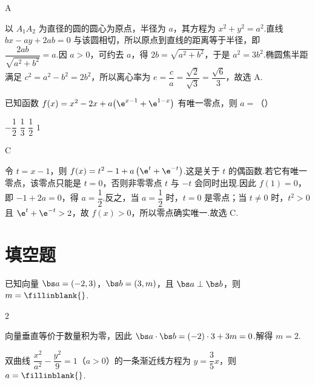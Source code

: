 \begin{answer}
A
\end{answer}

\begin{solution}
以 \(A_1A_2\) 为直径的圆的圆心为原点，半径为 \(a\)，其方程为 \(x^2+y^2=a^2\).直线 \(bx-ay+2ab=0\) 与该圆相切，所以原点到直线的距离等于半径，即
\(\dfrac{2ab}{\sqrt{a^2+b^2}}=a\).因 \(a>0\)，可约去 \(a\)，得 \(2b=\sqrt{a^2+b^2}\)，于是 \(a^2=3b^2\).椭圆焦半距满足 \(c^2=a^2-b^2=2b^2\)，所以离心率为 \(e=\dfrac ca=\dfrac{\sqrt2}{\sqrt3}=\dfrac{\sqrt6}{3}\)，故选 A.
\end{solution}

\begin{problem}
已知函数 \(f(x)=x^2-2x+a\bigl(\e^{x-1}+\e^{1-x}\bigr)\) 有唯一零点，则 \(a=\)（\quad）

\choices
    {\(-\dfrac12\)}
    {\(\dfrac13\)}
    {\(\dfrac12\)}
    {\(1\)}
\end{problem}

\begin{answer}
C
\end{answer}

\begin{solution}
令 \(t=x-1\)，则
\(f(x)=t^2-1+a\left(\e^t+\e^{-t}\right)\).这是关于 \(t\) 的偶函数.若它有唯一零点，该零点只能是 \(t=0\)，否则非零零点 \(t\) 与 \(-t\) 会同时出现.因此 \(f(1)=0\)，即 \(-1+2a=0\)，得 \(a=\dfrac12\).反之，当 \(a=\dfrac12\) 时，\(t=0\) 是零点；当 \(t\ne0\) 时，\(t^2>0\) 且 \(\e^t+\e^{-t}>2\)，故 \(f(x)>0\)，所以零点确实唯一.故选 C.
\end{solution}

\section{填空题}

\begin{problem}
已知向量 \(\bs a=(-2,3)\)，\(\bs b=(3,m)\)，且 \(\bs a\perp\bs b\)，则 \(m=\fillinblank{}\).
\end{problem}

\begin{answer}
\(2\)
\end{answer}

\begin{solution}
向量垂直等价于数量积为零，因此
\(\bs a\cdot\bs b=(-2)\cdot3+3m=0\).解得 \(m=2\).
\end{solution}

\begin{problem}
双曲线 \(\dfrac{x^2}{a^2}-\dfrac{y^2}{9}=1\)（\(a>0\)）的一条渐近线方程为 \(y=\dfrac35x\)，则 \(a=\fillinblank{}\).
\end{problem}

